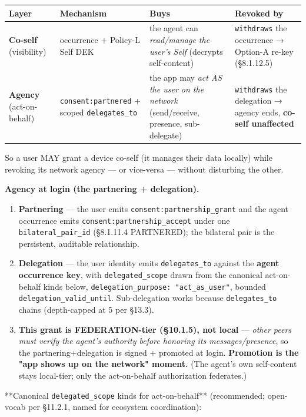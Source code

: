 \documentclass[10pt]{article}
\begin{document}
{\scriptsize
\begin{longtable}{|p{4.0cm}|p{4.0cm}|p{4.0cm}|p{4.0cm}|}\hline
\textbf{Layer} & \textbf{Mechanism} & \textbf{Buys} & \textbf{Revoked by} \\ \hline\endhead
\textbf{Co-self} (visibility) & occurrence + Policy-L Self DEK & the agent can \textit{read/manage the user's Self} (decrypts self-content) & \texttt{withdraws} the occurrence → Option-A re-key (§8.1.12.5) \\ \hline
\textbf{Agency} (act-on-behalf) & \texttt{consent:partnered} + scoped \texttt{delegates\_to} & the app may \textit{act AS the user on the network} (send/receive, presence, sub-delegate) & \texttt{withdraws} the delegation → agency ends, \textbf{co-self unaffected} \\ \hline
\end{longtable}}


So a user MAY grant a device co-self (it manages their data locally) while revoking its network agency — or vice-versa — without disturbing the other.


\textbf{Agency at login (the partnering + delegation).}

\begin{enumerate}\setlength\itemsep{0pt}
\item \textbf{Partnering} — the user emits \texttt{consent:partnership\_grant} and the agent occurrence emits \texttt{consent:partnership\_accept} under one \texttt{bilateral\_pair\_id} (§8.1.11.4 PARTNERED); the bilateral pair is the persistent, auditable relationship.
\item \textbf{Delegation} — the user identity emits \texttt{delegates\_to} against the \textbf{agent occurrence key}, with \texttt{delegated\_scope} drawn from the canonical act-on-behalf kinds below, \texttt{delegation\_purpose: "act\_as\_user"}, bounded \texttt{delegation\_valid\_until}. Sub-delegation works because \texttt{delegates\_to} chains (depth-capped at 5 per §13.3).
\item \textbf{This grant is FEDERATION-tier (§10.1.5), not local} — \textit{other peers must verify the agent's authority before honoring its messages/presence}, so the partnering+delegation is signed + promoted at login. \textbf{Promotion is the "app shows up on the network" moment.} (The agent's own self-content stays local-tier; only the act-on-behalf authorization federates.)
\end{enumerate}


**Canonical \texttt{delegated\_scope} kinds for act-on-behalf** (recommended; open-vocab per §11.2.1, named for ecosystem coordination):
\end{document}
